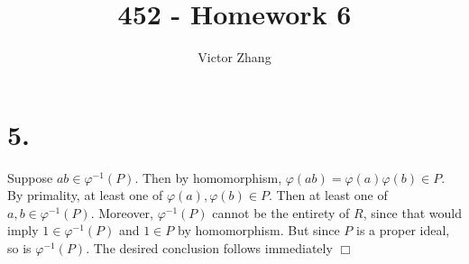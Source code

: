 \documentclass{article}
\title{452 - Homework 6}
\author{Victor Zhang}
\date{}
\begin{document}
\maketitle

\section*{5.}
Suppose $ab \in \varphi^{-1}(P)$. Then by homomorphism, $\varphi(ab) = \varphi(a)\varphi(b) \in P$. By primality, at least one of $\varphi(a),\varphi(b) \in P$. Then at least one of $a,b \in \varphi^{-1}(P)$. Moreover, $\varphi^{-1}(P)$ cannot be the entirety of $R$, since that would imply $1 \in \varphi^{-1}(P)$ and $1 \in P$ by homomorphism. But since $P$ is a proper ideal, so is $\varphi^{-1}(P)$. The desired conclusion follows immediately $\Box$
\end{document}
